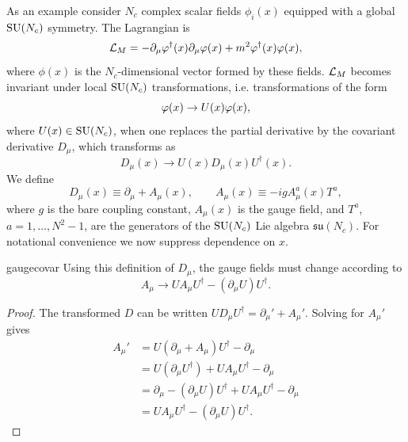 As an example consider $N_c$ complex scalar fields $\phi_{i}(x)$ equipped with 
a global $\operatorname{SU}(N_c)$ symmetry. The Lagrangian is
\begin{equation}\label{eq:LagrM}
  \mathcal{L}_{M}=-\partial_{\mu}\varphi^{\dagger}(x)\partial_{\mu}\varphi(x)
                +m^{2}\varphi^{\dagger}(x)\varphi(x),
\end{equation}
where $\phi(x)$ is the $N_c$-dimensional vector formed by these fields.
$\mathcal{L}_{M}$ becomes invariant under local $\operatorname{SU}(N_c)$ transformations, i.e. 
transformations of the form
\begin{equation}\label{eq:fxform}\index{gauge!transformation}
  \phi(x)\to U(x)\phi(x),
\end{equation}
where $U(x)\in \operatorname{SU}(N_c)$, when one replaces the partial derivative by the 
covariant derivative $D_\mu$, which transforms as
\begin{equation}\label{eq:dxform}
  D_\mu(x)\to U(x) D_{\mu}(x)U^{\dagger}(x).
\end{equation}
We define
\begin{equation}\label{eq:covariantderivative}
  D_{\mu}(x)\equiv\partial_{\mu}+A_{\mu}(x), \qquad 
       A_{\mu}(x)\equiv-igA^{a}_{\mu}(x)T^{a},
\end{equation}
where $g$ is the bare coupling constant, $A_{\mu}(x)$ is the gauge field, and 
$T^{a}$, $a=1,\dots,N^2-1$, are the generators of the $\operatorname{SU}(N_c)$ Lie algebra 
$\mathfrak{su}(N_c)$. For notational convenience we now suppress dependence
on $x$. 

\begin{proposition}{}{gaugecovar}
Using this definition of $D_\mu$, the gauge fields must change 
according to
$$A_{\mu}\to U A_{\mu}U^{\dagger}-(\partial_{\mu}U)U^{\dagger}.$$
  \begin{proof} The transformed $D$ can be written
  $U D_\mu U^\dagger=\partial_\mu'+A_\mu'$. Solving for $A_\mu'$ gives
    \begin{equation*}
    \begin{aligned}
         A_\mu'
         &=U(\partial_\mu+A_\mu)U^\dagger-\partial_\mu\\
         &=U(\partial_\mu U^\dagger)
               +U A_\mu U^\dagger-\partial_\mu\\
         &=\partial_\mu-(\partial_\mu U)U^\dagger
               +U A_\mu U^\dagger-\partial_\mu\\
         &=U A_\mu U^\dagger
                -(\partial_\mu U)U^\dagger.      
    \end{aligned}
    \end{equation*}
  \end{proof}
\end{proposition}

